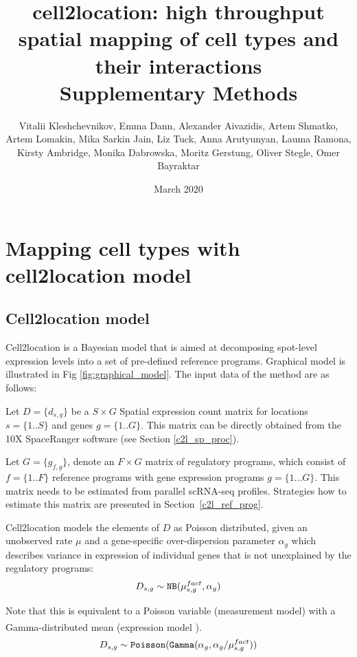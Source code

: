 \documentclass[11pt,a4paper]{article}
\title{cell2location: high throughput spatial mapping of cell types and their interactions \\
Supplementary Methods
}
\author{Vitalii Kleshchevnikov, Emma Dann, Alexander Aivazidis, Artem Shmatko, Artem Lomakin, Mika Sarkin Jain, Liz Tuck, Anna Arutyunyan, Lauma Ramona, Kirsty Ambridge, Monika Dabrowska, Moritz Gerstung, Oliver Stegle, Omer Bayraktar}
\date{March 2020}
\begin{document}
\maketitle

\tableofcontents

\section{Mapping cell types with cell2location model}

\subsection{Cell2location model} \label{cell2location_model}

Cell2location is a Bayesian model that is aimed at decomposing spot-level expression levels into a set of pre-defined reference programs. Graphical model is illustrated in Fig \ref{fig:graphical_model}. The input data of the method are as follows: \newline

Let $D=\{d_{s,g}\}$ be a $S \times G$ Spatial expression count matrix for locations $s=\{1..S\}$ and genes $g=\{1..G\}$. 
This matrix can be directly obtained from the 10X SpaceRanger software (see Section \ref{c2l_sp_proc}). \newline

Let $G=\{g_{f,g}\}$, denote an $F \times G$ matrix of regulatory programs, which consist of $f=\{1..F\}$ reference programs with gene expression programs $g=\{1...G\}$. This matrix needs to be estimated from parallel scRNA-seq profiles. Strategies how to estimate this matrix are presented in Section~\ref{c2l_ref_prog}. \newline

Cell2location models the elements of $D$ as Poisson distributed, given an unobserved rate $\mu$ and a gene-specific over-dispersion parameter $\alpha_g$ which describes variance in expression of individual genes that is not unexplained by the regulatory programs: 
\begin{equation} \label{eq:c2l:1}
D_{s,g} \sim \mathtt{NB}(\mu^{fact}_{s,g}, \alpha_g) \\
\end{equation}

Note that this is equivalent to a Poisson variable (measurement model) with a Gamma-distributed mean (expression model \textsuperscript{\cite{sarkar_separating_2020}}).
\begin{equation} \label{eq:c2l:1}
D_{s,g} \sim \mathtt{Poisson}(\mathtt{Gamma}(\alpha_g, \alpha_g / \mu^{fact}_{s,g})) \\
\end{equation}
\end{document}
